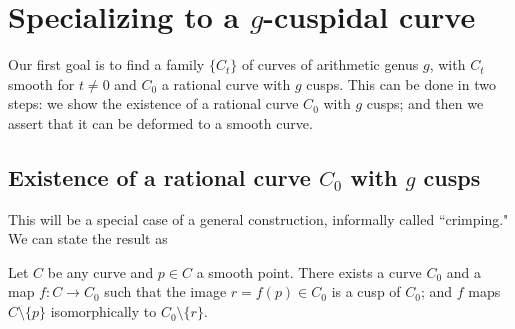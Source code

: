 %
%

\section{Specializing to a $g$-cuspidal curve}

Our first goal is to find a family $\{C_t\}$ of curves of arithmetic genus $g$, with $C_t$ smooth for $t \neq 0$ and $C_0$ a rational curve with $g$ cusps. This can be done in two steps: we show the existence of a rational curve $C_0$ with $g$ cusps; and then we assert that it can be deformed to a smooth curve.

\subsection{Existence of a rational curve $C_0$ with $g$ cusps}

This will be a special case of a general construction, informally called ``crimping." We can state the result as

\begin{proposition}
Let $C$ be any curve and $p \in C$ a smooth point. There exists a curve $C_0$ and a map $f : C \to C_0$ such that the image $r=f(p) \in C_0$ is a cusp of $C_0$; and $f$ maps $C \setminus \{p\}$ isomorphically to $C_0 \setminus \{r\}$.
\end{proposition}

